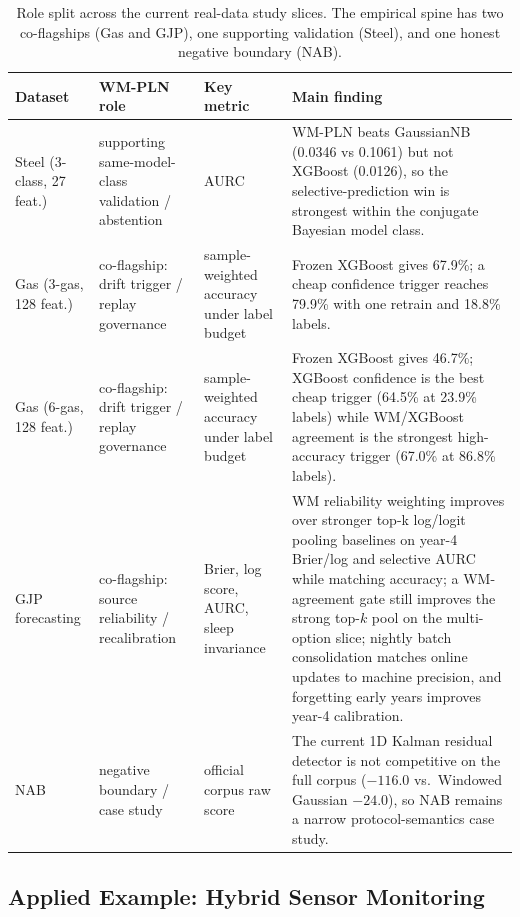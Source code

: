 \documentclass[11pt,openany]{report}
\begin{document}
\begin{table}[htbp]
\centering
\footnotesize
\setlength{\tabcolsep}{4pt}
\renewcommand{\arraystretch}{0.96}
\caption{Role split across the current real-data study slices.  The empirical
  spine has two co-flagships (Gas and GJP), one supporting validation
  (Steel), and one honest negative boundary (NAB).}
\label{tab:dataset-role-split}
\begin{tabular}{p{2.4cm}p{3.2cm}p{3.2cm}p{5.4cm}}
\toprule
Dataset & WM-PLN role & Key metric & Main finding \\
\midrule
Steel (3-class, 27 feat.) &
supporting same-model-class validation / abstention &
AURC &
WM-PLN beats GaussianNB (0.0346 vs 0.1061) but not XGBoost (0.0126), so the selective-prediction win is strongest within the conjugate Bayesian model class. \\
\addlinespace
Gas (3-gas, 128 feat.) &
co-flagship: drift trigger / replay governance &
sample-weighted accuracy under label budget &
Frozen XGBoost gives 67.9\%; a cheap confidence trigger reaches 79.9\% with one retrain and 18.8\% labels. \\
\addlinespace
Gas (6-gas, 128 feat.) &
co-flagship: drift trigger / replay governance &
sample-weighted accuracy under label budget &
Frozen XGBoost gives 46.7\%; XGBoost confidence is the best cheap trigger (64.5\% at 23.9\% labels) while WM/XGBoost agreement is the strongest high-accuracy trigger (67.0\% at 86.8\% labels). \\
\addlinespace
GJP forecasting &
co-flagship: source reliability / recalibration &
Brier, log score, AURC, sleep invariance &
WM reliability weighting improves over stronger top-k log/logit pooling baselines on year-4 Brier/log and selective AURC while matching accuracy; a WM-agreement gate still improves the strong top-$k$ pool on the multi-option slice; nightly batch consolidation matches online updates to machine precision, and forgetting early years improves year-4 calibration. \\
\addlinespace
NAB &
negative boundary / case study &
official corpus raw score &
The current 1D Kalman residual detector is not competitive on the full corpus ($-116.0$ vs.\ Windowed Gaussian $-24.0$), so NAB remains a narrow protocol-semantics case study. \\
\bottomrule
\end{tabular}
\end{table}

\subsection{Applied Example: Hybrid Sensor Monitoring}
\end{document}
